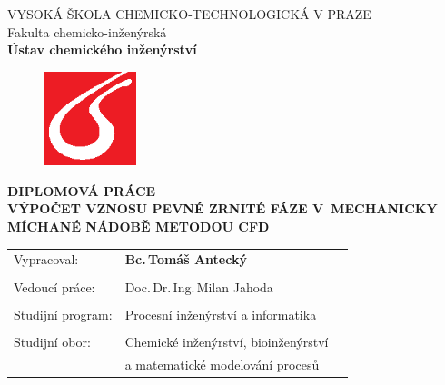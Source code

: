 \begin{center}
{\Large VYSOKÁ ŠKOLA CHEMICKO-TECHNOLOGICKÁ V PRAZE\\}
{\large Fakulta chemicko-inženýrská\\
\textbf{Ústav chemického inženýrství}\\}
\vspace{15mm}

\begin{figure}[!h]
\begin{center}
\includegraphics[angle=0,width=27mm]{images/logo_vscht.eps}
\end{center}
\end{figure}

\vspace{25mm}

{\huge \textbf{DIPLOMOVÁ PRÁCE\\}}
\vspace{10mm}
{\large \textbf{VÝPOČET VZNOSU PEVNÉ ZRNITÉ FÁZE V~MECHANICKY MÍCHANÉ NÁDOBĚ METODOU CFD\\}}
\end{center}
\vspace{25mm}

\begin{tabular}{p{50mm}lp{50mm}}
Vypracoval: & \textbf{Bc.\,Tomáš Antecký}\\
\\
Vedoucí práce: & Doc.\,Dr.\,Ing.\,Milan Jahoda \\

\\
Studijní program: & Procesní inženýrství a informatika \\
\\
Studijní obor: & Chemické inženýrství, bioinženýrství  \\
	& a matematické modelování procesů\\
\end{tabular}
